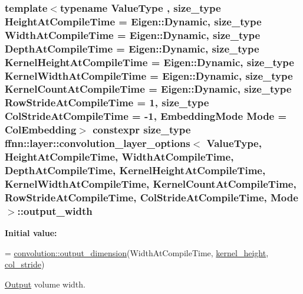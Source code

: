 \hypertarget{structffnn_1_1layer_1_1convolution__layer__options_a3d9d4fcab54f0e960fe1e860fa2ee76e}{
\subsubsection[{output\-\_\-width}]{\setlength{\rightskip}{0pt plus 5cm}template$<$typename Value\-Type , size\-\_\-type Height\-At\-Compile\-Time = Eigen\-::\-Dynamic, size\-\_\-type Width\-At\-Compile\-Time = Eigen\-::\-Dynamic, size\-\_\-type Depth\-At\-Compile\-Time = Eigen\-::\-Dynamic, size\-\_\-type Kernel\-Height\-At\-Compile\-Time = Eigen\-::\-Dynamic, size\-\_\-type Kernel\-Width\-At\-Compile\-Time = Eigen\-::\-Dynamic, size\-\_\-type Kernel\-Count\-At\-Compile\-Time = Eigen\-::\-Dynamic, size\-\_\-type Row\-Stride\-At\-Compile\-Time = 1, size\-\_\-type Col\-Stride\-At\-Compile\-Time = -\/1, Embedding\-Mode Mode = Col\-Embedding$>$ constexpr {\bf size\-\_\-type} {\bf ffnn\-::layer\-::convolution\-\_\-layer\-\_\-options}$<$ Value\-Type, Height\-At\-Compile\-Time, Width\-At\-Compile\-Time, Depth\-At\-Compile\-Time, Kernel\-Height\-At\-Compile\-Time, Kernel\-Width\-At\-Compile\-Time, Kernel\-Count\-At\-Compile\-Time, Row\-Stride\-At\-Compile\-Time, Col\-Stride\-At\-Compile\-Time, Mode $>$\-::output\-\_\-width\hspace{0.3cm}{\ttfamily [static]}}}\label{structffnn_1_1layer_1_1convolution__layer__options_a3d9d4fcab54f0e960fe1e860fa2ee76e}
{\bfseries Initial value\-:}
\begin{DoxyCode}
=
    \hyperlink{namespaceffnn_1_1layer_1_1convolution_aca263840b789df041d868a8a87dbf36a}{convolution::output\_dimension}(WidthAtCompileTime,  
      \hyperlink{structffnn_1_1layer_1_1convolution__layer__options_adfab0e8e8f7e9537dc60a0e56e311161}{kernel\_height}, \hyperlink{structffnn_1_1layer_1_1convolution__layer__options_ae76e5f96d43c1f6fd36d5c763a549922}{col\_stride})
\end{DoxyCode}


\hyperlink{classffnn_1_1layer_1_1_output}{Output} volume width. 

